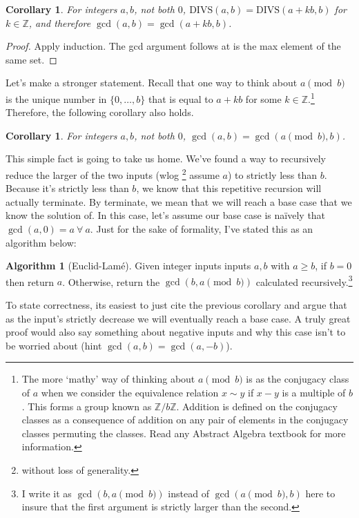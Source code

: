 \documentclass[10pt]{article}
\theoremstyle{plain}
\newtheorem{cor}[thm]{Corollary}
\theoremstyle{definition}
\newtheorem{alg}[thm]{Algorithm}
\newcommand{\ZZ}{\mathbb{Z}}
\numberwithin{equation}{section}
\numberwithin{figure}{section}
\begin{document}
\begin{cor}
For integers $a, b$, not both $0$, $\mathrm{DIVS}(a,b) = \mathrm{DIVS}(a + kb, b)$ for $k \in \ZZ$, and therefore $\gcd(a,b) = \gcd(a + kb, b)$. 
\end{cor}

\begin{proof}
Apply induction. The gcd argument follows at is the max element of the same set.
\end{proof}

\noindent Let's make a stronger statement. Recall that one way to think about $a \pmod b$ is the unique number in $\{0, \ldots, b\}$ that is equal to $a + kb$ for some $k \in \ZZ$.\footnote{The more `mathy' way of thinking about $a \pmod b$ is as the conjugacy class of $a$ when we consider the equivalence relation $x \sim y$ if $x  - y$ is a multiple of $b$. This forms a group known as $\ZZ / b \ZZ$. Addition is defined on the conjugacy classes as a consequence of addition on any pair of elements in the conjugacy classes permuting the classes. Read any Abstract Algebra textbook for more information.} Therefore, the following corollary also holds.

\begin{cor}
For integers $a, b$, not both $0$, $\gcd(a,b) = \gcd(a \pmod b, b)$.
\end{cor}

\noindent This simple fact is going to take us home. We've found a way to recursively reduce the larger of the two inputs (wlog \footnote{without loss of generality.} assume $a$) to strictly less than $b$. Because it's strictly less than $b$, we know that this repetitive recursion will actually terminate. By terminate, we mean that we will reach a base case that we know the solution of. In this case, let's assume our base case is na\"ively that $\gcd(a,0) = a \ \forall \ a$. Just for the sake of formality, I've stated this as an algorithm below:\\

\begin{alg}[Euclid-Lam\'e]
Given integer inputs inputs $a, b$ with $a \geq b$, if $b = 0$ then return $a$. Otherwise, return the $\gcd(b, a \pmod b)$ calculated recursively.\footnote{I write it as $\gcd(b, a \pmod b)$ instead of $\gcd(a \pmod b, b)$ here to insure that the first argument is strictly larger than the second.}
\end{alg}

\noindent To state correctness, its easiest to just cite the previous corollary and argue that as the input's strictly decrease we will eventually reach a base case. A truly great proof would also say something about negative inputs and why this case isn't to be worried about (hint $\gcd(a,b) = \gcd(a, -b)$). \\
\end{document}
